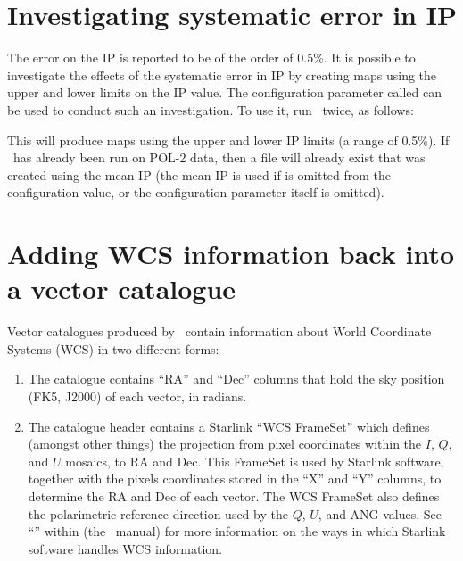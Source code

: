 \section{Investigating systematic error in IP}


The error on the IP is reported to be of the order of 0.5\%.  It is
possible to investigate the effects of the systematic error in IP by
creating maps using the upper and lower limits on the IP value. The
 configuration parameter called 
can be used to conduct such an investigation. To use it, run \poltwomap\ twice,
as follows:

\begin{terminalv}
\end{terminalv}

This will produce maps using the upper and lower IP limits (a range of
0.5\%). If \poltwomap\ has already been run on POL-2 data, then a file will
already exist that was created using the mean IP (the mean IP is used
if  is omitted from the configuration value, or the
configuration parameter itself is omitted).



\section{\label{sec:wcscopy}Adding WCS information back into a vector catalogue}
Vector catalogues produced by \poltwomap\ contain information about World Coordinate
Systems (WCS) in two different forms:

\begin{enumerate}
\item The catalogue contains ``RA'' and ``Dec'' columns that hold the sky position
(FK5, J2000) of each vector, in radians.
\item The catalogue header contains a Starlink ``WCS FrameSet'' which defines
(amongst other things) the projection from pixel coordinates within
the $I$, $Q$, and $U$ mosaics, to RA and Dec. This FrameSet is used by Starlink software, together
with the pixels coordinates stored in the ``X'' and ``Y'' columns, to determine
the RA and Dec of each vector. The WCS FrameSet also defines the polarimetric
reference direction used by the $Q$, $U$, and ANG values. See
``''
within  (the \KAPPA\ manual) for more information on
the ways in which Starlink software handles WCS information.
\end{enumerate}

